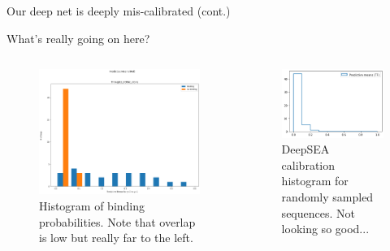\documentclass[pdf]{beamer} %
\begin{document}
\begin{frame}[t]{Our deep net is deeply mis-calibrated (cont.)}
    \begin{block}{}
        What's really going on here?
    \end{block}
    \begin{columns}
        \begin{figure}
            \includegraphics[scale=.2]{figures/predictive_mean_label_comparison}
            \caption{Histogram of binding probabilities. Note that overlap is low but really far to the left.}
        \end{figure}
        \begin{figure}
            \includegraphics[scale=.4]{figures/deepsea_calibration_hist}
            \caption{DeepSEA calibration histogram for randomly sampled sequences. Not looking so good...}
        \end{figure}
    \end{columns}
\end{frame}
\end{document}
